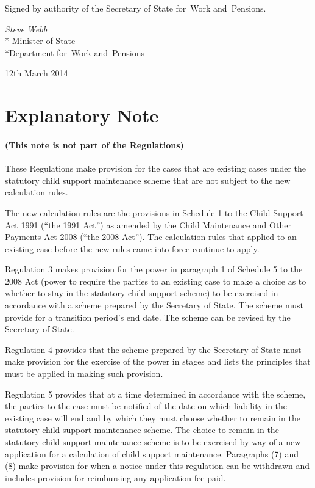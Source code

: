 \documentclass[12pt,a4paper]{article}
\begin{document}
\bigskip

\pagebreak[3]

Signed 
by authority of the 
Secretary of State for~Work and~Pensions.

{\raggedleft
\emph{Steve Webb}\\*
Minister
of State\\*Department 
for~Work and~Pensions

}

12th March 2014

\small

\part{Explanatory Note}

\renewcommand\parthead{— Explanatory Note}

\subsection*{(This note is not part of the Regulations)}

These Regulations make provision for the cases that are existing cases under the statutory child support maintenance scheme that are not subject to the new calculation rules.

The new calculation rules are the provisions in Schedule 1 to the Child Support Act 1991 (“the 1991 Act”) as amended by the Child Maintenance and Other Payments Act 2008 (“the 2008 Act”). The calculation rules that applied to an existing case before the new rules came into force continue to apply.

Regulation 3 makes provision for the power in paragraph 1 of Schedule 5 to the 2008 Act (power to require the parties to an existing case to make a choice as to whether to stay in the statutory child support scheme) to be exercised in accordance with a scheme prepared by the Secretary of State. The scheme must provide for a transition period’s end date. The scheme can be revised by the Secretary of State.

Regulation 4 provides that the scheme prepared by the Secretary of State must make provision for the exercise of the power in stages and lists the principles that must be applied in making such provision.

Regulation 5 provides that at a time determined in accordance with the scheme, the parties to the case must be notified of the date on which liability in the existing case will end and by which they must choose whether to remain in the statutory child support maintenance scheme. The choice to remain in the statutory child support maintenance scheme is to be exercised by way of a new application for a calculation of child support maintenance. Paragraphs (7) and (8) make provision for when a notice under this regulation can be withdrawn and includes provision for reimbursing any application fee paid.
\end{document}
